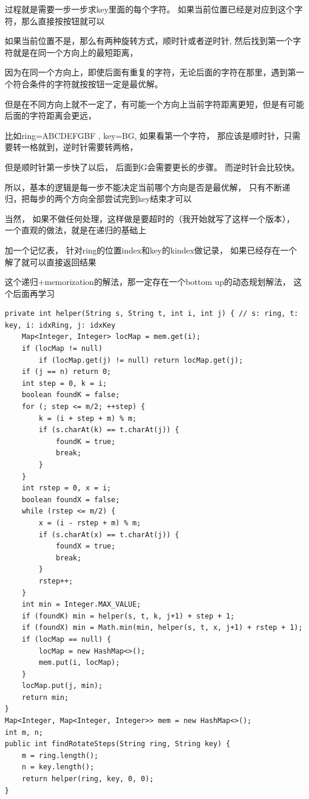 \documentclass[9pt, b5paaper]{book}
\begin{document}
\begin{enumerate}
过程就是需要一步一步求key里面的每个字符。 如果当前位置已经是对应到这个字符，那么直接按按钮就可以

如果当前位置不是，那么有两种旋转方式，顺时针或者逆时针, 然后找到第一个字符就是在同一个方向上的最短距离，

因为在同一个方向上，即使后面有重复的字符，无论后面的字符在那里，遇到第一个符合条件的字符就按按钮一定是最优解。

但是在不同方向上就不一定了，有可能一个方向上当前字符距离更短，但是有可能后面的字符距离会更远，

比如ring=ABCDEFGBF , key=BG, 如果看第一个字符， 那应该是顺时针，只需要转一格就到，逆时针需要转两格，

但是顺时针第一步快了以后， 后面到G会需要更长的步骤。 而逆时针会比较快。

所以，基本的逻辑是每一步不能决定当前哪个方向是否是最优解， 只有不断递归，把每步的两个方向全部尝试完到key结束才可以

当然， 如果不做任何处理，这样做是要超时的（我开始就写了这样一个版本）， 一个直观的做法，就是在递归的基础上

加一个记忆表， 针对ring的位置index和key的kindex做记录， 如果已经存在一个解了就可以直接返回结果

这个递归+memorization的解法，那一定存在一个bottom up的动态规划解法， 这个后面再学习

\begin{verbatim}
private int helper(String s, String t, int i, int j) { // s: ring, t: key, i: idxRing, j: idxKey
    Map<Integer, Integer> locMap = mem.get(i);
    if (locMap != null) 
        if (locMap.get(j) != null) return locMap.get(j);
    if (j == n) return 0;
    int step = 0, k = i;
    boolean foundK = false;
    for (; step <= m/2; ++step) {
        k = (i + step + m) % m;
        if (s.charAt(k) == t.charAt(j)) {
            foundK = true;
            break;
        }
    }
    int rstep = 0, x = i;
    boolean foundX = false;
    while (rstep <= m/2) {
        x = (i - rstep + m) % m;
        if (s.charAt(x) == t.charAt(j)) {
            foundX = true;
            break;
        }
        rstep++;
    }
    int min = Integer.MAX_VALUE;
    if (foundK) min = helper(s, t, k, j+1) + step + 1;
    if (foundX) min = Math.min(min, helper(s, t, x, j+1) + rstep + 1);
    if (locMap == null) {
        locMap = new HashMap<>();
        mem.put(i, locMap);
    }
    locMap.put(j, min);
    return min;
}
Map<Integer, Map<Integer, Integer>> mem = new HashMap<>();
int m, n;
public int findRotateSteps(String ring, String key) {
    m = ring.length();
    n = key.length();
    return helper(ring, key, 0, 0);
}
\end{verbatim}
\end{enumerate}
\end{document}
